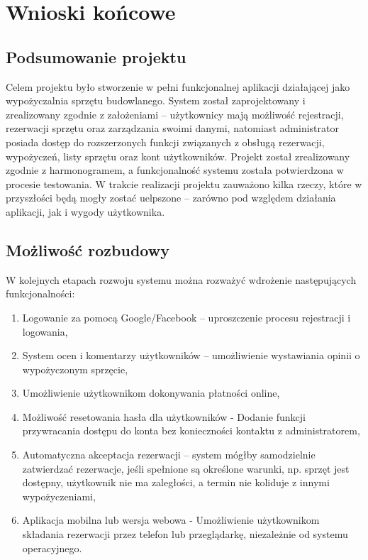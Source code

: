 \chapter{Wnioski końcowe}
\label{cha:wnioskiKoncowe}

\section{Podsumowanie projektu}
\label{sec:podsumowanieProjektu}
Celem projektu było stworzenie w pełni funkcjonalnej aplikacji działającej jako wypożyczalnia sprzętu budowlanego. System został zaprojektowany i zrealizowany zgodnie z założeniami – użytkownicy mają możliwość rejestracji, rezerwacji sprzętu oraz zarządzania swoimi danymi, natomiast administrator posiada dostęp do rozszerzonych funkcji związanych z obsługą rezerwacji, wypożyczeń, listy sprzętu oraz kont użytkowników. Projekt został zrealizowany zgodnie z harmonogramem, a funkcjonalność systemu została potwierdzona w procesie testowania. W trakcie realizacji projektu zauważono kilka rzeczy, które w przyszłości będą mogły zostać uelpszone – zarówno pod względem działania aplikacji, jak i wygody użytkownika.


\section{Możliwość rozbudowy}
\label{sec:mozliwoscRozbudowy}
W kolejnych etapach rozwoju systemu można rozważyć wdrożenie następujących funkcjonalności:
\begin{enumerate}
    \item Logowanie za pomocą Google/Facebook – uproszczenie procesu rejestracji i logowania,
    \item System ocen i komentarzy użytkowników – umożliwienie wystawiania opinii o wypożyczonym sprzęcie,
    \item Umożliwienie użytkownikom dokonywania płatności online,
    \item Możliwość resetowania hasła dla użytkowników - Dodanie funkcji przywracania dostępu do konta bez konieczności kontaktu z administratorem,
    \item Automatyczna akceptacja rezerwacji – system mógłby samodzielnie zatwierdzać rezerwacje, jeśli spełnione są określone warunki, np. sprzęt jest dostępny, użytkownik nie ma zaległości, a termin nie koliduje z innymi wypożyczeniami,
    \item Aplikacja mobilna lub wersja webowa - Umożliwienie użytkownikom składania rezerwacji przez telefon lub przeglądarkę, niezależnie od systemu operacyjnego.
\end{enumerate}